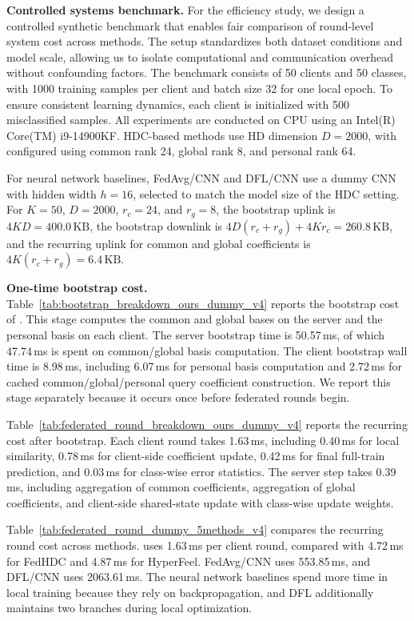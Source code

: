 \documentclass[lettersize,journal]{IEEEtran}
\newcommand{\rev}[1]{#1}
\begin{document}
\noindent\rev{\textbf{Controlled systems benchmark.}} For the efficiency study, we design a controlled synthetic benchmark that enables fair comparison of round-level system cost across methods.
The setup standardizes both dataset conditions and model scale, allowing us to isolate computational and communication overhead without confounding factors.
The benchmark consists of 50 clients and 50 classes, with 1000 training samples per client and batch size 32 for one local epoch.
To ensure consistent learning dynamics, each client is initialized with 500 misclassified samples.
All experiments are conducted on CPU using an Intel(R) Core(TM) i9-14900KF.
HDC-based methods use HD dimension \(D=2000\), with \Design configured using common rank 24, global rank 8, and personal rank 64.

For neural network baselines, FedAvg/CNN and DFL/CNN use a dummy CNN with hidden width \(h=16\), selected to match the model size of the HDC setting.
For \(K=50\), \(D=2000\), \(r_c=24\), and \(r_g=8\), the bootstrap uplink is \(4KD = 400.0\,\text{KB}\), the bootstrap downlink is \(4D(r_c+r_g) + 4Kr_c = 260.8\,\text{KB}\), and the recurring uplink for common and global coefficients is \(4K(r_c+r_g) = 6.4\,\text{KB}\).

\noindent\rev{\textbf{One-time bootstrap cost.}} Table~\ref{tab:bootstrap_breakdown_ours_dummy_v4} reports the bootstrap cost of \Design.
This stage computes the common and global bases on the server and the personal basis on each client.
The server bootstrap time is 50.57\,ms, of which 47.74\,ms is spent on common/global basis computation.
The client bootstrap wall time is 8.98\,ms, including 6.07\,ms for personal basis computation and 2.72\,ms for cached common/global/personal query coefficient construction.
We report this stage separately because it occurs once before federated rounds begin.

Table~\ref{tab:federated_round_breakdown_ours_dummy_v4} reports the recurring cost after bootstrap.
Each client round takes 1.63\,ms, including 0.40\,ms for local similarity, 0.78\,ms for \rev{client-side coefficient update}, 0.42\,ms for final full-train prediction, and 0.03\,ms for class-wise error statistics.
The server step takes 0.39\,ms, including aggregation of common coefficients, aggregation of global coefficients, and client-side shared-state update with class-wise update weights.

Table~\ref{tab:federated_round_dummy_5methods_v4} compares the recurring round cost across methods.
\Design uses 1.63\,ms per client round, compared with 4.72\,ms for FedHDC and 4.87\,ms for HyperFeel.
FedAvg/CNN uses 553.85\,ms, and DFL/CNN uses 2063.61\,ms.
The neural network baselines spend more time in local training because they rely on backpropagation, and DFL additionally maintains two branches during local optimization.
\end{document}
